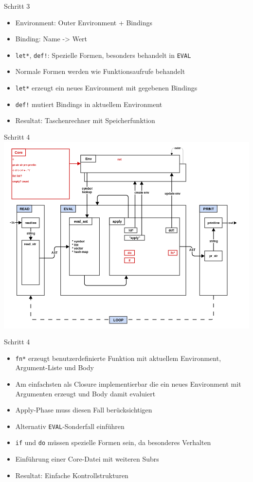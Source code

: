 \documentclass[presentation]{beamer}
\begin{document}
\begin{frame}[fragile,label=sec-3-13]{Schritt 3}
 \begin{itemize}
\item Environment: Outer Environment + Bindings
\item Binding: Name -> Wert
\item \texttt{let*}, \texttt{def!}: Spezielle Formen, besonders behandelt in \texttt{EVAL}
\item Normale Formen werden wie Funktionsaufrufe behandelt
\item \texttt{let*} erzeugt ein neues Environment mit gegebenen Bindings
\item \texttt{def!} mutiert Bindings in aktuellem Environment
\item Resultat: Taschenrechner mit Speicherfunktion
\end{itemize}
\end{frame}

\begin{frame}[label=sec-3-14]{Schritt 4}
\includegraphics[width=.9\linewidth]{./images/step4_if_fn_do.png}
\end{frame}

\begin{frame}[fragile,label=sec-3-15]{Schritt 4}
 \begin{itemize}
\item \texttt{fn*} erzeugt benutzerdefinierte Funktion mit aktuellem Environment,
Argument-Liste und Body
\item Am einfachsten als Closure implementierbar die ein neues Environment
mit Argumenten erzeugt und Body damit evaluiert
\item Apply-Phase muss diesen Fall berücksichtigen
\item Alternativ \texttt{EVAL}-Sonderfall einführen
\item \texttt{if} und \texttt{do} müssen spezielle Formen sein, da besonderes Verhalten
\item Einführung einer Core-Datei mit weiteren Subrs
\item Resultat: Einfache Kontrollstrukturen
\end{itemize}
\end{frame}
\end{document}
